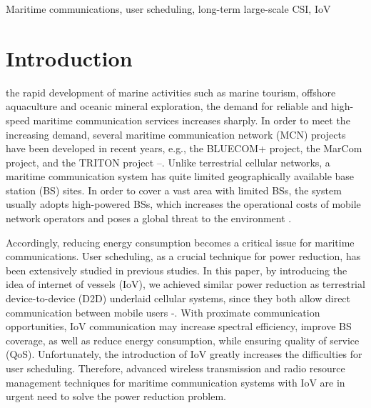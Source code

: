 \documentclass{ieeeaccess}
\begin{document}
\begin{keywords}
Maritime communications, user scheduling, long-term large-scale CSI, IoV
\end{keywords}

\titlepgskip=-15pt

\maketitle

\section{Introduction}
 the rapid development of marine activities such as marine tourism, offshore aquaculture and oceanic mineral exploration, the demand for reliable and high-speed maritime communication services increases sharply. In order to meet the increasing demand, several maritime communication network (MCN) projects have been developed in recent years, e.g., the BLUECOM+ project, the MarCom project, and the TRITON project \cite{p321}--\cite{p32}.
Unlike terrestrial cellular networks, a maritime communication system has quite limited geographically available base station (BS) sites. In order to cover a vast area with limited BSs, the system usually adopts high-powered BSs, which increases the operational costs of mobile network operators and poses a global threat to the environment \cite{p33}.

Accordingly, reducing energy consumption becomes a critical issue for maritime communications. User scheduling, as a crucial technique for power reduction, has been extensively studied in previous studies. In this paper, by introducing the idea of internet of vessels (IoV), we achieved similar power reduction as terrestrial device-to-device (D2D) underlaid cellular systems, since they both allow direct communication between mobile users \cite{p3331}-\cite{p3333}. With proximate communication opportunities, IoV communication may increase spectral efficiency, improve BS coverage, as well as reduce energy consumption, while ensuring quality of service (QoS). Unfortunately, the introduction of IoV greatly increases the difficulties for user scheduling. 
Therefore, advanced wireless transmission and radio resource management techniques for maritime communication systems with IoV are in urgent need to solve the power reduction problem.
\end{document}
